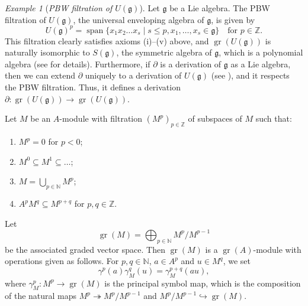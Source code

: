 \documentclass[a4paper, 12pt, reqno]{amsart}
\theoremstyle{remark}
\newtheorem{example}[theorem]{Example}
\DeclareMathOperator{\gr}{gr}
\DeclareMathOperator{\vspan}{span}
\begin{document}
\begin{example}[\emph{PBW filtration of $U(\mathfrak{g})$}]
  \label{exa:1}
  Let $\mathfrak{g}$ be a Lie algebra.
  The PBW filtration of $U(\mathfrak{g})$, the universal enveloping algebra of $\mathfrak{g}$, is given by
  \begin{equation*}
    U(\mathfrak{g})^p = \vspan\{x_1x_2\dots x_s \mid s \le p, x_1, \dots, x_s \in \mathfrak{g}\} \quad \text{for $p \in \mathbb{Z}$}.
  \end{equation*}
  This filtration clearly satisfies axioms (i)--(v) above, and $\gr(U(\mathfrak{g}))$ is naturally isomorphic to $S(\mathfrak{g})$, the symmetric algebra of $\mathfrak{g}$, which is a polynomial algebra (see \cite[\S2]{dixmier_enveloping_1996} for details).
  Furthermore, if $\partial$ is a derivation of $\mathfrak{g}$ as a Lie algebra, then we can extend $\partial$ uniquely to a derivation of $U(\mathfrak{g})$ (see \cite[Proposition 2.4.9(i)]{dixmier_enveloping_1996}), and it respects the PBW filtration.
  Thus, it defines a derivation $\partial: \gr(U(\mathfrak{g})) \to \gr(U(\mathfrak{g}))$.
\end{example}

Let $M$ be an $A$-module with filtration $(M^p)_{p \in \mathbb{Z}}$ of subspaces of $M$ such that:
\begin{enumerate}
\item $M^p = 0$ for $p < 0$;
\item $M^0 \subseteq M^1 \subseteq \dots$;
\item $M = \bigcup_{p \in \mathbb{N}}M^p$;
\item $A^pM^q \subseteq M^{p + q}$ for $p, q \in \mathbb{Z}$.
\end{enumerate}

Let
\begin{equation*}
  \gr(M) = \bigoplus_{p \in \mathbb{N}}M^p/M^{p - 1}
\end{equation*}
be the associated graded vector space.
Then $\gr(M)$ is a $\gr(A)$-module with operations given as follows.
For $p, q \in \mathbb{N}$, $a \in A^p$ and $u \in M^q$, we set
\begin{equation*}
  \gamma^p(a)\gamma^q_M(u) = \gamma^{p + q}_M(au),
\end{equation*}
where $\gamma^p_M: M^p \to \gr(M)$ is the principal symbol map, which is the composition of the natural maps $M^p \twoheadrightarrow M^p/M^{p - 1}$ and $M^p/M^{p - 1} \hookrightarrow \gr(M)$.
\end{document}
